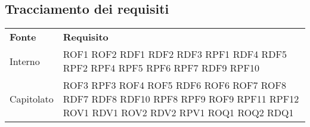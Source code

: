 \subsection{Tracciamento dei requisiti}
\begin{longtable}{| p{5cm} | p{5cm} |}
		\rowcolor{LightBlue}
		\color{white}\bfseries Fonte & \color{white}\bfseries Requisito \\[0.25cm]
		Interno & 	ROF1 \newline
					ROF2 \newline
					RDF1 \newline
					RDF2 \newline
					RDF3 \newline
					RPF1 \newline
					RDF4 \newline
					RDF5 \newline
					RPF2 \newline
					RPF4 \newline
					RPF5 \newline
					RPF6 \newline
					RPF7 \newline
					RDF9 \newline
					RPF10 \\
					
		\rowcolor{LightGray}
		Capitolato & 	ROF3 \newline
						RPF3\newline
						ROF4\newline
						ROF5\newline
						RDF6\newline
						ROF6\newline
						ROF7\newline
						ROF8\newline
						RDF7\newline
						RDF8\newline
						RDF10\newline
						RPF8\newline
						RPF9\newline
						ROF9\newline
						RPF11\newline
						RPF12\newline
						ROV1\newline
						RDV1\newline
						ROV2\newline
						RDV2\newline
						RPV1\newline
						ROQ1\newline
						ROQ2\newline
						RDQ1 \\
		

\end{longtable}
